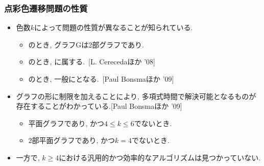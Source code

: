 \documentclass[dvipdfmx,11pt]{beamer}
\begin{document}
\begin{frame}\frametitle{点彩色遷移問題の性質}

  \begin{itemize}
    \item 色数$k$によって問題の性質が異なることが知られている.
    \begin{itemize}
      \item {}のとき, グラフGは2部グラフであり.
      \item {}のとき, に属する.~[L. Cerecedaほか '08]
      \item {}のとき, 一般にとなる.~[Paul Bonsmaほか '09]
    \end{itemize}

    \item グラフの形に制限を加えることにより, 多項式時間で解決可能となるものが存在することがわかっている.[Paul Bonsmaほか '09]
    \begin{itemize}
      \item 平面グラフであり, かつ$4 \le k \le 6$でないとき.
      \item 2部平面グラフであり, かつ$k=4$でないとき.
    \end{itemize}

    \item 一方で, \alert{$k \ge 4$における汎用的かつ効率的なアルゴリズムは見つかっていない}.

  \end{itemize}

\end{frame}

\end{document}
